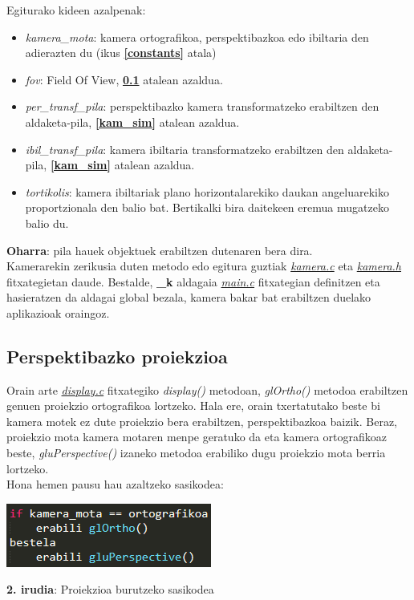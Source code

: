\documentclass[12pt]{article}
\newcommand{\fitxategi}[1] {\underline{\textit{#1}}}
\newcommand{\metodo}[1] {\textit{#1}}
\newcommand{\aldagai}[1] {\textit{#1}}
\newcommand{\erref}[1] {\textbf{\ref{#1}}}
\begin{document}
Egiturako kideen azalpenak:

\begin{itemize}
\item \aldagai{kamera\_mota}: kamera ortografikoa, perspektibazkoa edo ibiltaria den adierazten du (ikus \erref{constants} atala)
\item \aldagai{fov}: Field Of View\cite{fov}, \erref{per_proj} atalean azaldua.
\item \aldagai{per\_transf\_pila}: perspektibazko kamera transformatzeko erabiltzen den aldaketa-pila, \erref{kam_sim} atalean azaldua.
\item \aldagai{ibil\_transf\_pila}: kamera ibiltaria transformatzeko erabiltzen den aldaketa-pila, \erref{kam_sim} atalean azaldua.
\item \aldagai{tortikolis}: kamera ibiltariak plano horizontalarekiko daukan angeluarekiko proportzionala den balio bat. Bertikalki bira daitekeen eremua mugatzeko balio du.
\end{itemize}

\textbf{Oharra}: pila hauek objektuek erabiltzen dutenaren bera dira.\\

Kamerarekin zerikusia duten metodo edo egitura guztiak \fitxategi{kamera.c} eta \fitxategi{kamera.h} fitxategietan daude.
Bestalde, \textbf{\_k} aldagaia \fitxategi{main.c} fitxategian definitzen eta hasieratzen da aldagai global bezala, kamera bakar bat erabiltzen duelako aplikazioak oraingoz.


\subsection{Perspektibazko proiekzioa}\label{per_proj}
Orain arte \fitxategi{display.c} fitxategiko \metodo{display()} metodoan, \metodo{glOrtho()} metodoa erabiltzen genuen proiekzio ortografikoa lortzeko. Hala ere, orain txertatutako beste bi kamera motek ez dute proiekzio bera erabiltzen, perspektibazkoa baizik. Beraz, proiekzio mota kamera motaren menpe geratuko da eta kamera ortografikoaz beste, \metodo{gluPerspective()}\cite{glu_perspective} izaneko metodoa erabiliko dugu proiekzio mota berria lortzeko.\\
Hona hemen pausu hau azaltzeko sasikodea:

\begin{center}
\includegraphics[scale=1]{kamera_projection.png}

\textbf{2. irudia}: Proiekzioa burutzeko sasikodea
\end{center}
\end{document}
